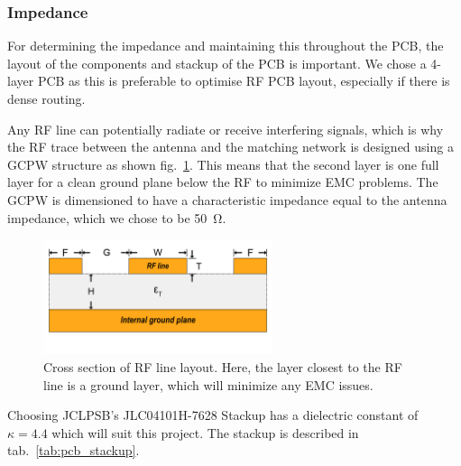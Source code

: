 \subsubsection{Impedance}
For determining the impedance and maintaining this throughout the \ac{PCB}, the layout of the components and stackup of the \ac{PCB} is important. We chose a 4-layer \ac{PCB} as this is preferable to optimise \ac{RF} \ac{PCB} layout, especially if there is dense routing. 

Any \ac{RF} line can potentially radiate or receive interfering signals, which is why the \ac{RF} trace between the antenna and the matching network is designed using a \ac{GCPW} structure as shown fig.~\ref{fig:gcpw}. This means that the second layer is one full layer for a clean ground plane below the \ac{RF} to minimize \ac{EMC} problems. The \ac{GCPW} is dimensioned to have a characteristic impedance equal to the antenna impedance, which we chose to be \SI{50}{\ohm}.

\begin{figure}[H]
    \centering
    \includegraphics[width=0.6\textwidth]{figures/GCPW.png}
    \caption{Cross section of RF line layout. Here, the layer closest to the RF line is a ground layer, which will minimize any EMC issues.}
    \label{fig:gcpw}
\end{figure}

Choosing JCLPSB's JLC04101H-7628 Stackup has a dielectric constant of $\kappa = 4.4$ which will suit this project. The stackup is described in tab.~\ref{tab:pcb_stackup}.

